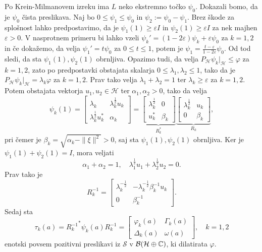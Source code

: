 \begin{dokaz}
    Po Krein-Milmanovem izreku ima $L$ neko ekstremno točko $\psi_0$.
    Dokazali bomo, da je $\psi_0$ čista preslikava. Naj bo $0 \leq \psi_1 \leq \psi_0$ in $\psi_2 := \psi_0 - \psi_1$.
    Brez škode za splošnost lahko predpostavimo, da je $\psi_1 (1) \geq \varepsilon I$ in $\psi_2 (1) \geq \varepsilon I$ za nek majhen $\varepsilon > 0$.
    V nasprotnem primeru bi lahko vzeli
    $\psi_k' = (1 - 2\varepsilon)\psi_k + \varepsilon \psi_0$ za $k = 1, 2$
    in če dokažemo, da velja 
    $\psi_1 ' = t \psi_0$ za $0 \leq t \leq 1$, potem je $\psi_1 = \frac{t - \varepsilon}{1 - 2\varepsilon} \psi_0$.
    Od tod sledi, da sta $\psi_1 (1), \psi_2 (1)$ obrnljiva. Opazimo tudi, da velja $P_{\mathcal{H}} \psi_k \big|_{\mathcal{H}} \leq \varphi$ za $k = 1, 2$,
    zato po predpostavki obstajata skalarja $0 \leq \lambda_1, \lambda_2 \leq 1$, tako da je 
    $P_{\mathcal{H}} \psi_k \big|_{\mathcal{H}} = \lambda_k \varphi$ za $k = 1, 2$.
    Prav tako velja $\lambda_1 + \lambda_2 = 1$ ter $\lambda_k \geq \varepsilon$ za $k = 1, 2$. 
    Potem obstajata vektorja $u_1, u_2 \in \mathcal{H}$ ter $\alpha_1, \alpha_2 >0$, tako da velja
    $$\psi_k (1) = \begin{bmatrix}
        \lambda_k & \lambda_k ^{\frac{1}{2}} u_k\\
        \lambda_k ^{\frac{1}{2}}  u_k ^* & \alpha_k 
    \end{bmatrix} = \underbrace{\begin{bmatrix}
        \lambda_k ^{\frac{1}{2}} & 0\\
        u_k ^* & \beta_k
    \end{bmatrix}}_{R_k ^*} \underbrace{\begin{bmatrix}
        \lambda_k ^{\frac{1}{2}} & u_k\\
        0 & \beta_k
    \end{bmatrix}}_{R_k},$$
    pri čemer je $\beta_k = \sqrt{\alpha_k - \| \xi \|^2} > 0$, saj sta $\psi_1 (1), \psi_2 (1)$ obrnljiva.
    Ker je $\psi_1 (1) + \psi_2 (1) = I$, mora veljati 
    $$\alpha_1 + \alpha_2 = 1,\quad \lambda_1 ^{\frac{1}{2}} u_1 + \lambda_2 ^{\frac{1}{2}} u_2 = 0.$$
    Prav tako je 
    $$R_k ^{-1} = \begin{bmatrix}
        \lambda_k ^{-\frac{1}{2}} & - \lambda_k ^{-\frac{1}{2}} \beta_k ^{-1} u_k\\
        0 & \beta_k ^{-1}
    \end{bmatrix}.$$
    Sedaj sta 
    $$\tau_k (a) = {R_{k} ^{-1}}^* \psi_k (a) R_k ^{-1} = \begin{bmatrix}
        \varphi_k (a) & \Gamma_k (a)\\
        \Delta_k (a) & \omega (a)
    \end{bmatrix},\quad k = 1, 2$$
    enotski povsem pozitivni preslikavi iz $\mathcal{S}$ v $\mathcal{B}(\mathcal{H} \oplus \mathbb C)$, ki dilatirata $\varphi$.


\end{dokaz}
